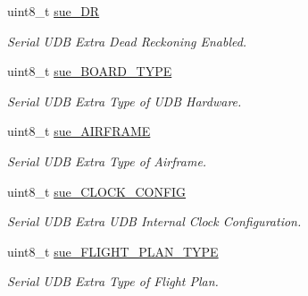 \begin{DoxyCompactItemize}
uint8\+\_\+t \hyperlink{struct____mavlink__serial__udb__extra__f14__t_a7410cd01620015447093a02dd1dcc935}{sue\+\_\+\+D\+R}
\begin{DoxyCompactList}\small\item\em Serial U\+D\+B Extra Dead Reckoning Enabled. \end{DoxyCompactList}\item 
uint8\+\_\+t \hyperlink{struct____mavlink__serial__udb__extra__f14__t_abc6af3b4b7490c46735f7c0de24f52e3}{sue\+\_\+\+B\+O\+A\+R\+D\+\_\+\+T\+Y\+P\+E}
\begin{DoxyCompactList}\small\item\em Serial U\+D\+B Extra Type of U\+D\+B Hardware. \end{DoxyCompactList}\item 
uint8\+\_\+t \hyperlink{struct____mavlink__serial__udb__extra__f14__t_a0e09b96692a7d864a59592971bce5037}{sue\+\_\+\+A\+I\+R\+F\+R\+A\+M\+E}
\begin{DoxyCompactList}\small\item\em Serial U\+D\+B Extra Type of Airframe. \end{DoxyCompactList}\item 
uint8\+\_\+t \hyperlink{struct____mavlink__serial__udb__extra__f14__t_a63c71b88d7206c2df79b30866e3a2853}{sue\+\_\+\+C\+L\+O\+C\+K\+\_\+\+C\+O\+N\+F\+I\+G}
\begin{DoxyCompactList}\small\item\em Serial U\+D\+B Extra U\+D\+B Internal Clock Configuration. \end{DoxyCompactList}\item 
uint8\+\_\+t \hyperlink{struct____mavlink__serial__udb__extra__f14__t_add774c2b8e742c3c8c85faa85b49c894}{sue\+\_\+\+F\+L\+I\+G\+H\+T\+\_\+\+P\+L\+A\+N\+\_\+\+T\+Y\+P\+E}
\begin{DoxyCompactList}\small\item\em Serial U\+D\+B Extra Type of Flight Plan. \end{DoxyCompactList}\end{DoxyCompactItemize}


